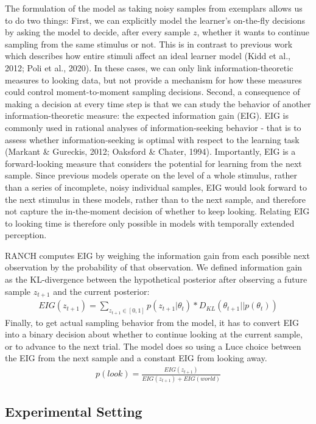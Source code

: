 \documentclass[10pt, letterpaper]{article}
\begin{document}
The formulation of the model as taking noisy samples from exemplars
allows us to do two things: First, we can explicitly model the learner's
on-the-fly decisions by asking the model to decide, after every sample
\(z\), whether it wants to continue sampling from the same stimulus or
not. This is in contrast to previous work which describes how entire
stimuli affect an ideal learner model (Kidd et al., 2012; Poli et al.,
2020). In these cases, we can only link information-theoretic measures
to looking data, but not provide a mechanism for how these measures
could control moment-to-moment sampling decisions. Second, a consequence
of making a decision at every time step is that we can study the
behavior of another information-theoretic measure: the expected
information gain (EIG). EIG is commonly used in rational analyses of
information-seeking behavior - that is to assess whether
information-seeking is optimal with respect to the learning task
(Markant \& Gureckis, 2012; Oaksford \& Chater, 1994). Importantly, EIG
is a forward-looking measure that considers the potential for learning
from the next sample. Since previous models operate on the level of a
whole stimulus, rather than a series of incomplete, noisy individual
samples, EIG would look forward to the next stimulus in these models,
rather than to the next sample, and therefore not capture the
in-the-moment decision of whether to keep looking. Relating EIG to
looking time is therefore only possible in models with temporally
extended perception.

RANCH computes EIG by weighing the information gain from each possible
next observation by the probability of that observation. We defined
information gain as the KL-divergence between the hypothetical posterior
after observing a future sample \(z_{t+1}\) and the current posterior:
\begin{eqnarray}
EIG(z_{t+1}) = \sum_{z_{t+1} \in [0,1]} p(z_{t+1}|\theta_t) * D_{KL}(\theta_{t+1} || p(\theta_t))
\end{eqnarray} Finally, to get actual sampling behavior from the model,
it has to convert EIG into a binary decision about whether to continue
looking at the current sample, or to advance to the next trial. The
model does so using a Luce choice between the EIG from the next sample
and a constant EIG from looking away. \begin{eqnarray}
p(look) = \frac{EIG(z_{t+1})}{EIG(z_{t+1})+EIG(world)}
\end{eqnarray}

\hypertarget{experimental-setting}{%
\subsection{Experimental Setting}\label{experimental-setting}}
\end{document}
